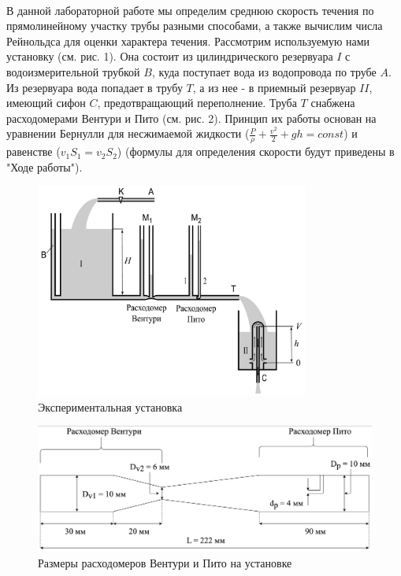 \documentclass[a4paper, 12pt]{article}
\begin{document}
\paragraph{}
В данной лабораторной работе мы определим среднюю скорость течения по прямолинейному участку трубы разными способами, а также вычислим числа Рейнольдса для оценки характера течения.
Рассмотрим используемую нами установку (см. рис. 1). Она состоит из цилиндрического резервуара $I$ с водоизмерительной трубкой $B$, куда поступает вода из водопровода по трубе $A$. Из резервуара вода попадает в трубу $T$, а из нее - в приемный резервуар $II$, имеющий сифон $C$, предотвращающий переполнение. Труба $T$ снабжена расходомерами Вентури и Пито (см. рис. 2).
Принцип их работы основан на уравнении Бернулли для несжимаемой жидкости ($\frac{P}{\rho} + \frac{v^2}{2} + gh = const$) и равенстве ($v_1S_1 = v_2S_2$) (формулы для определения скорости будут приведены в "Ходе работы").
\begin{figure}[h!]
        \includegraphics[width=0.8\textwidth]{ustanovka.png}
        \caption{Экспериментальная установка}
        \label{ris:ustanovka}
\end{figure}
\begin{figure}[h!]
        \includegraphics[width=1.0\textwidth]{pitovent.png}
        \caption{Размеры расходомеров Вентури и Пито на установке}
        \label{ris:ustanovka}
\end{figure}
\end{document}
